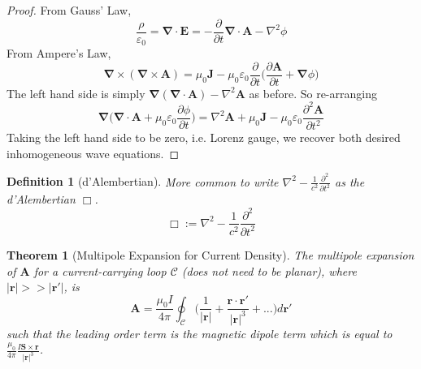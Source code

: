 \documentclass[a4paper]{article}
\theoremstyle{new}
\newtheorem{defi}{Definition}[section]
\newtheorem{thm}{Theorem}[section]
\begin{document}
\begin{proof}
From Gauss' Law,
$$\frac{\rho}{\varepsilon_0}=\boldsymbol{\nabla}\cdot\mathbf{E}=-\frac{\partial}{\partial t}\boldsymbol{\nabla}\cdot\mathbf{A}-\nabla^2\phi$$
From Ampere's Law,
$$\boldsymbol{\nabla}\times(\boldsymbol{\nabla}\times\mathbf{A})=\mu_0\mathbf{J}-\mu_0\varepsilon_0\frac{\partial}{\partial t}\bigg(\frac{\partial\mathbf{A}}{\partial t}+\boldsymbol{\nabla}\phi\bigg)$$
The left hand side is simply $\boldsymbol{\nabla}(\boldsymbol{\nabla}\cdot\mathbf{A})-\nabla^2\mathbf{A}$ as before. So re-arranging
$$\boldsymbol{\nabla}\bigg(\boldsymbol{\nabla}\cdot\mathbf{A}+\mu_0\varepsilon_0\frac{\partial\phi}{\partial t}\bigg)=\nabla^2\mathbf{A}+\mu_0\mathbf{J}-\mu_0\varepsilon_0\frac{\partial^2\mathbf{A}}{\partial t^2}$$
Taking the left hand side to be zero, i.e. Lorenz gauge, we recover both desired inhomogeneous wave equations.
\end{proof}
\begin{defi}[d'Alembertian]
More common to write  $\nabla^2-\frac{1}{c^2}\frac{\partial^2}{\partial t^2}$ as the d'Alembertian $\Box$.
$$\Box:=\nabla^2-\frac{1}{c^2}\frac{\partial^2}{\partial t^2}$$
\end{defi}
\begin{thm}[Multipole Expansion for Current Density]
The multipole expansion of $\mathbf{A}$ for a current-carrying loop $\mathcal{C}$ (does not need to be planar), where $|\mathbf{r}|>>|\mathbf{r'}|$, is
$$\mathbf{A}=\frac{\mu_0I}{4\pi}\oint_{\mathcal{C}}\bigg(\frac{1}{|\mathbf{r}|}+\frac{\mathbf{r}\cdot\mathbf{r'}}{|\mathbf{r}|^3}+...\bigg)d\mathbf{r'}$$
such that the leading order term is the magnetic dipole term which is equal to $\frac{\mu_0}{4\pi}\frac{I\mathbf{S}\times\mathbf{r}}{|\mathbf{r}|^3}$. 
\end{thm}
\end{document}
